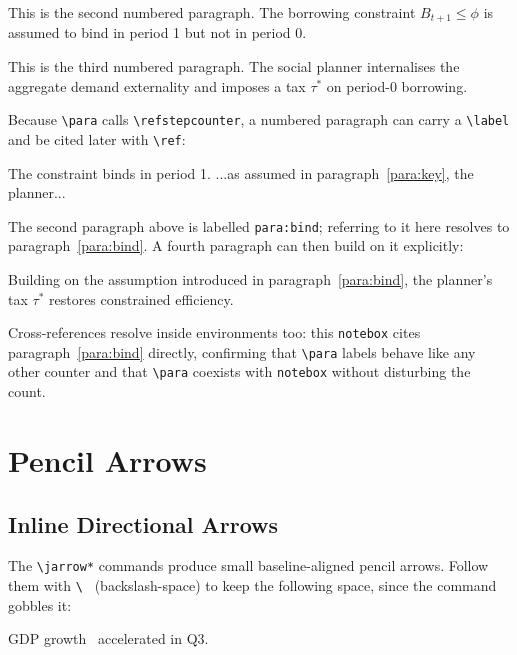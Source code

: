 \documentclass[11pt,a4paper]{article}
\begin{document}
\para\label{para:bind} This is the second numbered paragraph. The borrowing constraint $B_{t+1} \leq \phi$ is assumed to bind in period 1 but not in period 0.

\para This is the third numbered paragraph. The social planner internalises the aggregate demand externality and imposes a tax $\tau^*$ on period-0 borrowing.

Because \verb|\para| calls \verb|\refstepcounter|, a numbered paragraph can carry a \verb|\label| and be cited later with \verb|\ref|:

\begin{democode}
\para\label{para:key} The constraint binds in period 1.
...as assumed in paragraph~\ref{para:key}, the planner...
\end{democode}

\noindent The second paragraph above is labelled \verb|para:bind|; referring to it here resolves to paragraph~\ref{para:bind}. A fourth paragraph can then build on it explicitly:

\para Building on the assumption introduced in paragraph~\ref{para:bind}, the planner's tax $\tau^*$ restores constrained efficiency.

\begin{notebox}
    Cross-references resolve inside environments too: this \verb|notebox| cites paragraph~\ref{para:bind} directly, confirming that \verb|\para| labels behave like any other counter and that \verb|\para| coexists with \verb|notebox| without disturbing the count.
\end{notebox}

\section{Pencil Arrows}

\subsection{Inline Directional Arrows}

The \verb|\jarrow*| commands produce small baseline-aligned pencil arrows. Follow them with \verb|\ | (backslash-space) to keep the following space, since the command gobbles it:

\begin{democode}
GDP growth \jarrowup\ accelerated in Q3.
\jarrowup[color=tomato]   %
\jarrowr[len=0.6cm,lw=0.1cm]   %
\end{democode}
\end{document}

